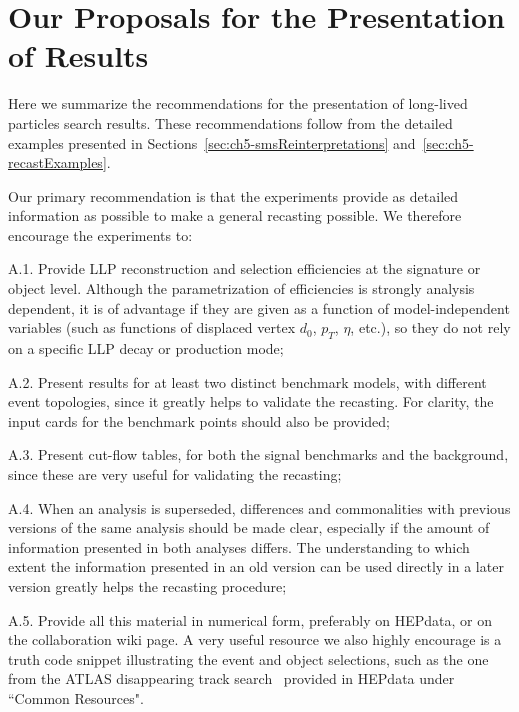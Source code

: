 \section{Our Proposals for the Presentation of Results}
\label{sec:ch5-rec_summary}

Here we summarize the recommendations for the presentation of long-lived
particles search results. These recommendations follow from the detailed
examples presented in Sections~\ref{sec:ch5-smsReinterpretations}
and~\ref{sec:ch5-recastExamples}.

Our primary recommendation is that the experiments provide as detailed
information as possible to make a general recasting possible.
We therefore encourage the experiments to:
\begin{description*}
  \item[A.1.] Provide LLP reconstruction and selection efficiencies at the signature or object level. Although the parametrization of efficiencies is strongly analysis dependent, it is of advantage if they are given as a function of model-independent variables (such as functions of displaced vertex $d_0$, $p_T$, $\eta$, etc.), so
  they do not rely on a specific LLP decay or production mode;
  \item[A.2.] Present results for at least two distinct benchmark
  models, with different event topologies, since it greatly helps to validate the recasting. For clarity, the input cards for the benchmark points should also be provided;
  \item[A.3.] Present cut-flow tables, for both the signal
    benchmarks and the background, since these are  very useful for
    validating the recasting;
  \item[A.4.]  When an analysis is superseded, differences and commonalities with previous versions of the same analysis should be made clear, especially if the amount of information presented in both analyses differs. The understanding to which extent
   the information presented in an old version can be used directly in a later version greatly
   helps the recasting procedure;
  \item[A.5.] Provide all this material in numerical form, preferably on HEPdata, or on the collaboration wiki page. A very useful resource we also highly encourage is a truth code snippet illustrating the event and object selections, such as the one from the ATLAS disappearing track
  search~\cite{Aaboud:2017mpt} provided in HEPdata under ``Common Resources".
\end{description*}

